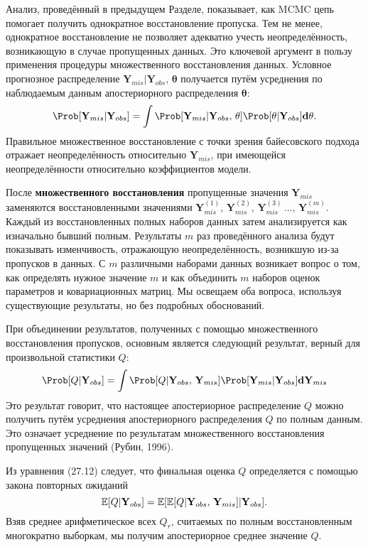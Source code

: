 Анализ, проведённый в предыдущем Разделе, показывает, как  MCMC цепь помогает получить однократное восстановление пропуска. Тем не менее, однократное восстановление не позволяет адекватно учесть неопределённость, возникающую в случае пропущенных данных. Это ключевой аргумент в пользу применения процедуры множественного восстановления данных. Условное прогнозное распределение $\mathbf{Y}_{mis}|\mathbf{Y}_{obs}, \, \mathbf{\theta}$ получается путём усреднения по наблюдаемым данным апостериорного распределения $\mathbf{\theta}$:
\[
\Prob[\mathbf{Y}_{mis}|\mathbf{Y}_{obs}] = \int \Prob[\mathbf{Y}_{mis}|\mathbf{Y}_{obs}, \, \mathbf{\theta}] \Prob[\mathbf{\theta}|\mathbf{Y}_{obs}]\mathbf{d\theta}.
\]
Правильное множественное восстановление с точки зрения байесовского подхода отражает неопределённость относительно $\mathbf{Y}_{mis}$, при имеющейся неопределённости относительно  коэффициентов модели.

После {\bf множественного восстановления} пропущенные значения $\mathbf{Y}_{mis}$ заменяются восстановленными значениями $\mathbf{Y}_{mis}^{(1)}, \, \mathbf{Y}_{mis}^{(2)}, \, \mathbf{Y}_{mis}^{(3)}\, \dots, \, \mathbf{Y}_{mis}^{(m)}$. Каждый из восстановленных полных наборов данных затем анализируется как изначально бывший полным. Результаты $m$ раз проведённого анализа будут показывать изменчивость, отражающую неопределённость, возникшую из-за пропусков в данных. С $m$ различными наборами данных возникает вопрос о том, как определять нужное значение $m$ и как объединить $m$ наборов оценок параметров и ковариационных матриц. Мы освещаем оба вопроса, используя существующие результаты, но без подробных обоснований.

При объединении результатов, полученных с помощью множественного восстановления пропусков, основным является следующий результат, верный для произвольной статистики $Q$:
\begin{equation}
\Prob[Q|\mathbf{Y}_{obs}] = 
\int \Prob[Q|\mathbf{Y}_{obs}, \, \mathbf{Y}_{mis}] 
\Prob[\mathbf{Y}_{mis}|\mathbf{Y}_{obs}]\mathbf{d}\mathbf{Y}_{mis}
\end{equation}
Это результат говорит, что настоящее апостериорное распределение $Q$ можно получить путём усреднения апостериорного распределения $Q$ по полным данным. Это означает усреднение  по результатам множественного восстановления пропущенных значений (Рубин, 1996).

Из уравнения (27.12) следует, что финальная оценка $Q$ определяется с помощью закона повторных ожиданий
\begin{equation}
\mathbb{E}[Q|\mathbf{Y}_{obs}]=\mathbb{E}[\mathbb{E}[Q|\mathbf{Y}_{obs}, \, \mathbf{Y}_{mis}]|\mathbf{Y}_{obs}].
\end{equation}
Взяв среднее арифметическое всех $Q_r$, считаемых по полным восстановленным многократно выборкам, мы получим апостериорное среднее значение $Q$.

